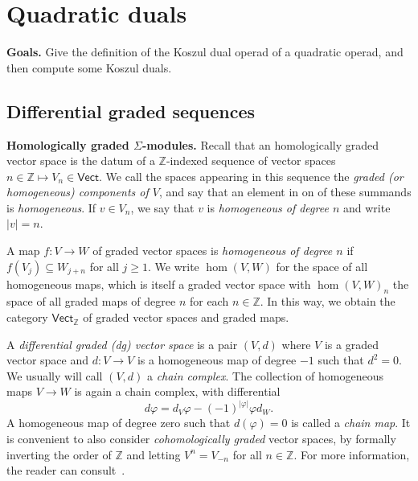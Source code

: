 
\section{Quadratic duals}\label{lecture:KD1}
\textbf{Goals.}
Give the definition of the Koszul dual
operad of a quadratic operad, and then compute
some Koszul duals.

\subsection{Differential graded sequences}


\textbf{Homologically graded $\Sigma$-modules.}
Recall that an homologically graded vector space is
the datum of a $\mathbb Z$-indexed sequence of vector
spaces $n\in\mathbb Z\longmapsto V_n\in\mathsf{Vect}$.
We call the spaces appearing in this sequence the \emph{graded (or
homogeneous) components of $V$}, and say that an element in 
on of these summands is \emph{homogeneous}. If
$v\in V_n$, we say that $v$ is \emph{homogeneous of
degree $n$} and write $|v|=n$. 

A map $f : V\longrightarrow W$ of graded vector spaces
is \emph{homogeneous of degree $n$} if $f(V_j)\subseteq W_{j+n}$ for
all $j\geqslant 1$. We write $\hom(V,W)$ for the
space of all homogeneous maps, which is itself a graded
vector space with $\hom(V,W)_n$ the space of all
graded maps of degree $n$ for each $n\in\mathbb Z$. 
In this way, we obtain the category $\mathsf{Vect}_\mathbb{Z}$
of graded vector spaces and graded maps. 

A \emph{differential graded (dg) vector space} is a pair 
$(V,d)$ where $V$ is a graded vector space and 
$d : V\longrightarrow V$ is a homogeneous map of degree 
$-1$ such that $d^2=0$. We usually will call $(V,d)$
a \emph{chain complex}. The collection of homogeneous
maps $V\longrightarrow W$ is again a chain
complex, with differential
\[ d\varphi 
	= d_V\varphi - (-1)^{|\varphi|} \varphi d_W. \]
A homogeneous map of degree zero such that $d(\varphi)=0$
is called a \emph{chain map}.
It is
convenient to also consider \emph{cohomologically graded}
vector spaces, by formally inverting the order of $\mathbb{Z}$
and letting $V^n = V_{-n}$ for all $n\in\mathbb Z$. 
For more information, the reader can consult~\cite{Weibel1994,
Gelfand2003,Hilton1997,Cartan1956}.

\bigskip


